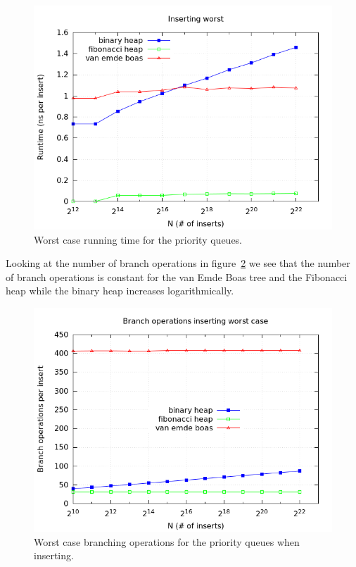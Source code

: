 \documentclass[a4paper,oneside,article,11pt]{memoir}
\begin{document}
\begin{figure}[H]
\includegraphics[scale=0.5]{../res2/inserts/runtime_worst.png}
\caption{Worst case running time for the priority queues.}
\label{fig:insert_worst_running}
\end{figure}

Looking at the number of branch operations in figure~\ref{fig:insert_worst_branch} we see that the number of branch operations is constant for the van Emde Boas tree and the Fibonacci heap while the binary heap increases logarithmically.

\begin{figure}[H]
\includegraphics[scale=0.5]{../res2/inserts/branch_worst.png}
\caption{Worst case branching operations for the priority queues when inserting.}
\label{fig:insert_worst_branch}
\end{figure}
\end{document}
